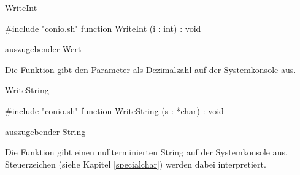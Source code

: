 \newpage

\begin{function}{WriteInt}

\syntax
\#include "conio.sh"
function WriteInt (i : int) : void
\endgroup

\parameters
{} auszugebender Wert \cr

\usage
Die Funktion  gibt den Parameter  als
Dezimalzahl
auf der Systemkonsole aus.

\fseealso
{}
\end{function}


\begin{function}{WriteString}

\syntax
\#include "conio.sh"
function WriteString (s : *char) : void
\endgroup

\parameters
{} auszugebender String \cr

\usage
Die Funktion  gibt einen nullterminierten String
auf der Systemkonsole aus. Steuerzeichen (siehe Kapitel
\ref{specialchar}) werden dabei interpretiert.

\fseealso
{}
\end{function}


\newpage
{}
\footnotesize
\printindex


